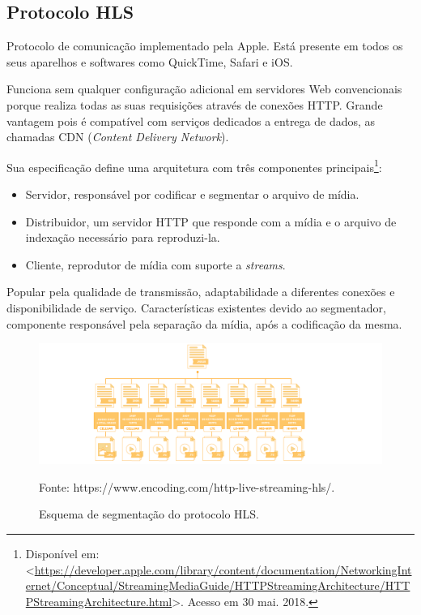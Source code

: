 \subsection{Protocolo HLS}

Protocolo de comunicação implementado pela Apple. Está presente em todos os seus aparelhos e softwares como QuickTime, Safari e iOS.

Funciona sem qualquer configuração adicional em servidores Web convencionais porque realiza todas as suas requisições através de conexões HTTP. Grande vantagem pois é compatível com serviços dedicados a entrega de dados, as chamadas CDN (\textit{Content Delivery Network}).

Sua especificação define uma arquitetura com três componentes principais\footnote{Disponível em: 
<\url{https://developer.apple.com/library/content/documentation/NetworkingInternet/Conceptual/StreamingMediaGuide/HTTPStreamingArchitecture/HTTPStreamingArchitecture.html}>. Acesso em 30 mai. 2018.}:


\begin{itemize}
	\item Servidor, responsável por codificar e segmentar o arquivo de mídia.
    \item Distribuidor, um servidor HTTP que responde com a mídia e o arquivo de indexação necessário para reproduzi-la. 
    \item Cliente, reprodutor de mídia com suporte a \textit{streams}.
\end{itemize}

Popular pela qualidade de transmissão, adaptabilidade a diferentes conexões e disponibilidade de serviço. Características existentes devido ao segmentador, componente responsável pela separação da mídia, após a codificação da mesma.

\begin{figure}[ht!]
	\centering
    \includegraphics[scale=0.45]{figures/hls-segments.png} 
    \caption{Esquema de segmentação do protocolo HLS.}
    \small Fonte: https://www.encoding.com/http-live-streaming-hls/.
	\label{fig:hls_segments}
\end{figure}

